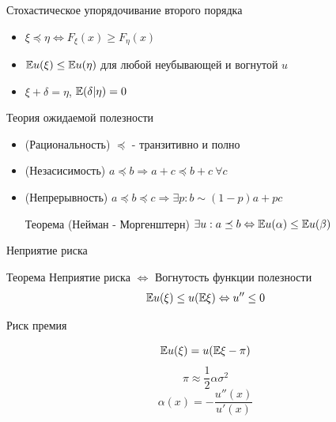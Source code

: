 \documentclass{beamer}
\begin{document}
\begin{frame}{Стохастическое упорядочивание второго порядка}
\begin{itemize}
\item $
\xi \preceq \eta \Leftrightarrow F_\xi(x) \geq F_\eta(x)
$
\item $\mathbb{E} u(\xi) \leq \mathbb{E} u(\eta)$ для любой неубывающей и вогнутой $u$

\item $\xi + \delta = \eta$, $\mathbb{E}(\delta|\eta)=0$

\end{itemize}

\end{frame}

\begin{frame}{Теория ожидаемой полезности}
\begin{itemize}
\item (Рациональность) $\preceq$ - транзитивно и полно 
\item (Незасисимость) $a\preceq b \Rightarrow a + c \preceq b + c\  \forall c$ 
\item (Непрерывность) $a\preceq b \preceq c \Rightarrow \exists p:  b \sim (1-p)a + pc$  

\begin{block}{Теорема (Нейман -  Моргенштерн)}
    $\exists u:  a\preceq b \Leftrightarrow \mathbb{E} u(\alpha) \leq \mathbb{E} u(\beta)$
\end{block}

\end{itemize}

\end{frame}


\begin{frame}{Неприятие риска}

\begin{block}{Теорема}
    Неприятие риска $\Leftrightarrow$ Вогнутость функции полезности
    $$
    \mathbb{E} u(\xi) \leq u(\mathbb{E} \xi) \Leftrightarrow u''\leq 0
    $$
\end{block}

\end{frame}

\begin{frame}{Риск премия}

$$
\mathbb{E} u(\xi) = u(\mathbb{E}\xi - \pi)
$$
$$
\pi \approx \frac12 \alpha \sigma^2 
$$
$$
\alpha(x) = - \frac{u''(x)}{u'(x)}
$$


\end{frame}
\end{document}
